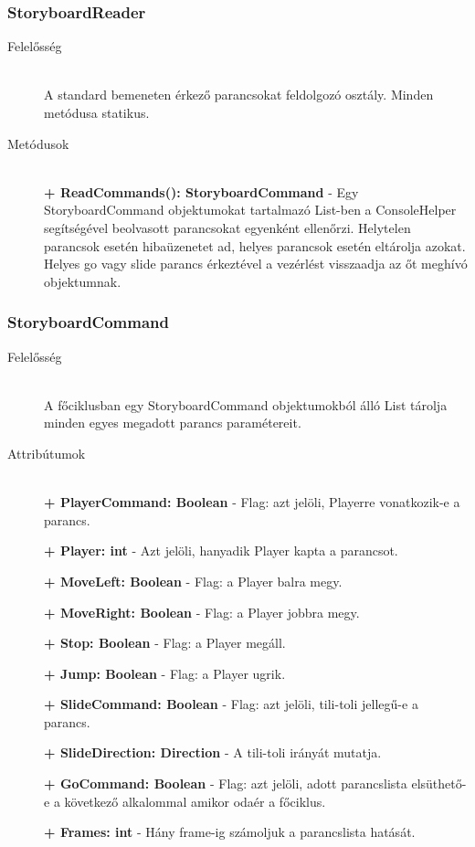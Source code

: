 \subsubsection{StoryboardReader}
	\begin{description}
		\item[Felelősség] \hfill \\
		A standard bemeneten érkező parancsokat feldolgozó osztály. Minden metódusa statikus.

		\item[Metódusok] \hfill \\
		\textbf{+ ReadCommands(): StoryboardCommand} - Egy StoryboardCommand objektumokat tartalmazó List-ben a ConsoleHelper segítségével beolvasott parancsokat egyenként ellenőrzi. Helytelen parancsok esetén hibaüzenetet ad, helyes parancsok esetén eltárolja azokat. Helyes go vagy slide parancs érkeztével a vezérlést visszaadja az őt meghívó objektumnak.

	\end{description}
	
\subsubsection{StoryboardCommand}
	\begin{description}
		\item[Felelősség] \hfill \\
		A főciklusban egy StoryboardCommand objektumokból álló List tárolja minden egyes megadott parancs paramétereit.

		\item[Attribútumok] \hfill \\
		\textbf{+ PlayerCommand: Boolean} - Flag: azt jelöli, Playerre vonatkozik-e a parancs.

		\textbf{+ Player: int} - Azt jelöli, hanyadik Player kapta a parancsot.

		\textbf{+ MoveLeft: Boolean} - Flag: a Player balra megy.

		\textbf{+ MoveRight: Boolean} - Flag: a Player jobbra megy.

		\textbf{+ Stop: Boolean} - Flag: a Player megáll.

		\textbf{+ Jump: Boolean} - Flag: a Player ugrik.

		\textbf{+ SlideCommand: Boolean} - Flag: azt jelöli, tili-toli jellegű-e a parancs.

		\textbf{+ SlideDirection: Direction} - A tili-toli irányát mutatja.

		\textbf{+ GoCommand: Boolean} - Flag: azt jelöli, adott parancslista elsüthető-e a következő alkalommal amikor odaér a főciklus.

		\textbf{+ Frames: int} - Hány frame-ig számoljuk a parancslista hatását.

	\end{description}

